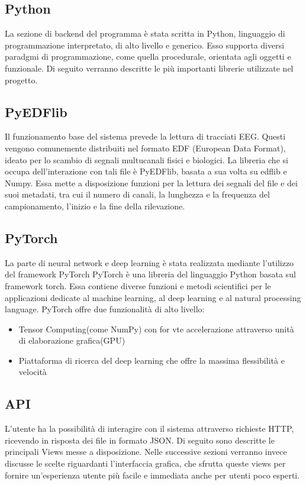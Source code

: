 \documentclass{article}
\begin{document}
\subsection{Python}
La sezione di backend del programma è stata scritta in Python, linguaggio di programmazione interpretato, di alto livello e generico.
Esso supporta diversi paradgmi di programmazione, come quella procedurale, orientata agli oggetti e funzionale. 
Di seguito verranno descritte le più importanti librerie utilizzate nel progetto.

\subsection{PyEDFlib}
Il funzionamento base del sistema prevede la lettura di tracciati EEG. Questi vengono comunemente distribuiti nel formato EDF (European Data Format), ideato per lo scambio di segnali multucanali fisici e biologici. La libreria che si occupa dell'interazione con tali file è PyEDFlib, basata a sua volta su edflib e Numpy. Essa mette a disposizione funzioni per la lettura dei segnali del file e dei suoi metadati, tra cui il numero di canali, la lunghezza e la frequenza del campionamento, l'inizio e la fine della rilevazione. 

\subsection{PyTorch}
La parte di neural network e deep learning è stata realizzata mediante l'utilizzo del framework PyTorch
PyTorch è una libreria del linguaggio Python basata sul framework torch.
Essa contiene diverse funzioni e metodi scientifici per le applicazioni dedicate al machine learning, al deep learning e al natural processing language.
PyTorch offre  due funzionalità di alto livello:
\begin{itemize}
\item Tensor Computing(come NumPy) con for vte accelerazione attraverso unità di elaborazione grafica(GPU)
\item Piattaforma di ricerca del deep learning che offre la massima flessibilità e  velocità 
\end{itemize}

\subsection{API}
L'utente ha la possibilità di interagire con il sistema attraverso richieste HTTP, ricevendo in risposta dei file in formato JSON. Di seguito sono descritte le principali Views messe a disposizione. Nelle successive sezioni verranno invece discusse le scelte riguardanti l'interfaccia grafica, che sfrutta queste views per fornire un'esperienza utente più facile e immediata anche per utenti poco esperti.
\end{document}
